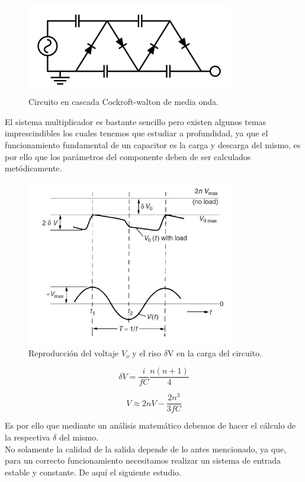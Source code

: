 \begin{figure}[H]
\centering
\includegraphics[width=9cm]{capitulo2/figs/circ.png}
\caption{ Circuito en cascada Cockroft-walton de media onda.}
\end{figure}
El sistema multiplicador es bastante sencillo pero existen algunos temas imprescindibles los cuales tenemos que estudiar a profundidad, ya que el funcionamiento fundamental de un capacitor es la carga y descarga del mismo, es por ello que los parámetros del componente deben de ser calculados metódicamente.

\begin{figure}[H]
\centering
\includegraphics[width=9cm]{capitulo2/figs/riso.png}
\caption{ Reproducción del voltaje $V_{o}$ y el riso $\delta$V en la carga del circuito.}
\end{figure}

\begin{equation}
\delta V=\frac{i}{fC}\frac{n(n+1)}{4}
\end{equation}

\begin{equation}
V\approx 2nV-\frac{2n^{3}}{3fC}
\end{equation}

Es por ello que mediante un análisis matemático debemos de hacer el cálculo de la respectiva $\delta$ del mismo.\\
No solamente la calidad de la salida depende de lo antes mencionado, ya que, para un correcto funcionamiento necesitamos realizar un sistema de entrada estable y constante. De aquí el siguiente estudio.
\newpage
